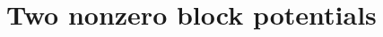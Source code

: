 \begingroup

\chapter{Two nonzero block potentials}
\label{ch:two-nonzero-block-potentials}

\endgroup
